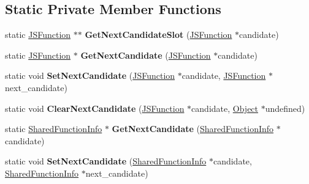 \subsection*{Static Private Member Functions}
\begin{DoxyCompactItemize}
\item 
static \hyperlink{classv8_1_1internal_1_1_j_s_function}{J\+S\+Function} $\ast$$\ast$ {\bfseries Get\+Next\+Candidate\+Slot} (\hyperlink{classv8_1_1internal_1_1_j_s_function}{J\+S\+Function} $\ast$candidate)\hypertarget{classv8_1_1internal_1_1_code_flusher_ac063f413b30d794e52a8b03374adace8}{}\label{classv8_1_1internal_1_1_code_flusher_ac063f413b30d794e52a8b03374adace8}

\item 
static \hyperlink{classv8_1_1internal_1_1_j_s_function}{J\+S\+Function} $\ast$ {\bfseries Get\+Next\+Candidate} (\hyperlink{classv8_1_1internal_1_1_j_s_function}{J\+S\+Function} $\ast$candidate)\hypertarget{classv8_1_1internal_1_1_code_flusher_a2d544d91e0148bc44551e18303c00b8b}{}\label{classv8_1_1internal_1_1_code_flusher_a2d544d91e0148bc44551e18303c00b8b}

\item 
static void {\bfseries Set\+Next\+Candidate} (\hyperlink{classv8_1_1internal_1_1_j_s_function}{J\+S\+Function} $\ast$candidate, \hyperlink{classv8_1_1internal_1_1_j_s_function}{J\+S\+Function} $\ast$next\+\_\+candidate)\hypertarget{classv8_1_1internal_1_1_code_flusher_a07f1b2e59acc21413aa326476aa189f6}{}\label{classv8_1_1internal_1_1_code_flusher_a07f1b2e59acc21413aa326476aa189f6}

\item 
static void {\bfseries Clear\+Next\+Candidate} (\hyperlink{classv8_1_1internal_1_1_j_s_function}{J\+S\+Function} $\ast$candidate, \hyperlink{classv8_1_1internal_1_1_object}{Object} $\ast$undefined)\hypertarget{classv8_1_1internal_1_1_code_flusher_a1ff6b6008a187324faab09368dd91655}{}\label{classv8_1_1internal_1_1_code_flusher_a1ff6b6008a187324faab09368dd91655}

\item 
static \hyperlink{classv8_1_1internal_1_1_shared_function_info}{Shared\+Function\+Info} $\ast$ {\bfseries Get\+Next\+Candidate} (\hyperlink{classv8_1_1internal_1_1_shared_function_info}{Shared\+Function\+Info} $\ast$candidate)\hypertarget{classv8_1_1internal_1_1_code_flusher_ade9b1674020deb243a21a76f47724ac5}{}\label{classv8_1_1internal_1_1_code_flusher_ade9b1674020deb243a21a76f47724ac5}

\item 
static void {\bfseries Set\+Next\+Candidate} (\hyperlink{classv8_1_1internal_1_1_shared_function_info}{Shared\+Function\+Info} $\ast$candidate, \hyperlink{classv8_1_1internal_1_1_shared_function_info}{Shared\+Function\+Info} $\ast$next\+\_\+candidate)\hypertarget{classv8_1_1internal_1_1_code_flusher_adc4171f82c10985e4afaffa10e325772}{}\label{classv8_1_1internal_1_1_code_flusher_adc4171f82c10985e4afaffa10e325772}


\end{DoxyCompactItemize}
